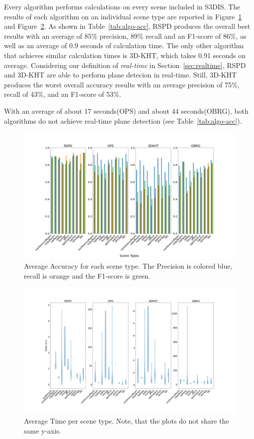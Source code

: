 \documentclass[main.tex]{subfiles}
\begin{document}
Every algorithm performs calculations on every scene included in S3DIS.
The results of each algorithm on an individual scene type are reported in Figure~\ref{fig:stanfordaccuracy} and Figure~\ref{fig:violintime}. As shown in Table~\ref{tab:algo-acc},
RSPD produces the overall best results with an average of 85\% precision, 89\% recall and an F1-score of 86\%, as well as an average of 0.9 seconds of calculation time.
The only other algorithm that achieves similar calculation times is 3D-KHT, which takes 0.91 seconds on average. Considering our definition of \textit{real-time} in Section~\ref{sec:realtime},
RSPD and 3D-KHT are able to perform plane detecion in real-time. Still, 3D-KHT produces the worst overall accuracy results with an average precision of 75\%, recall of 43\%, and an F1-score of 53\%.

With an average of about 17 seconds(OPS) and about 44 seconds(OBRG), both algorithms do not achieve real-time plane detection (see Table~\ref{tab:algo-acc}).


\begin{figure}[]
    \centering
    \includegraphics[width=15 cm]{images/accuracy_total.png}
    \caption[Accuracy Results S3DIS]{Average Accuracy for each scene type. The Precision
        is colored blue, recall is orange and the F1-score is green.}
    \label{fig:stanfordaccuracy}
\end{figure}

\begin{figure}[]
    \centering
    \includegraphics[width=15 cm]{images/times_violin.png}
    \caption[Time Results S3DIS]{Average Time per scene type. Note, that the plots
        do not share the same y-axis.}
    \label{fig:violintime}
\end{figure}
\end{document}
